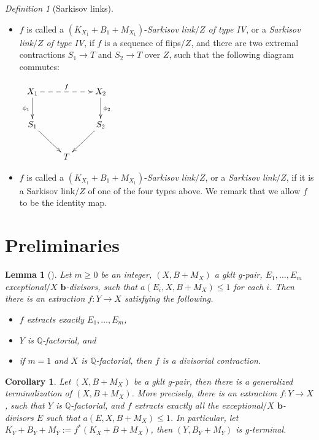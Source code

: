 \documentclass[11pt]{amsart}
\numberwithin{equation}{section}
\newcommand{\bb}{\bm{b}}
\newcommand{\Qq}{\mathbb{Q}}
\newtheorem{cor}[thm]{Corollary}
\newtheorem{lem}[thm]{Lemma}
\theoremstyle{definition}
\theoremstyle{remark}
\newtheorem{defn}[thm]{Definition}
\theoremstyle{definition}
\begin{document}
\begin{defn}[Sarkisov links]
\begin{itemize}
\item $f$ is called a $(K_{X_1}+B_1+M_{X_1})$-\emph{Sarkisov link$/Z$ of type IV}, or a \emph{Sarkisov link$/Z$ of type IV}, if $f$ is a sequence of flips$/Z$, and there are two extremal contractions $S_1\rightarrow T$ and $S_2\rightarrow T$ over $Z$, such that the following diagram commutes:
\begin{center}$\xymatrix{
 X_1\ar@{-->}[rr]^{f}\ar@{->}[d]_{\phi_1}& &X_2\ar@{->}[d]^{\phi_2} \\
      S_1\ar@{->}[dr]   &  & S_2\ar@{->}[dl] \\
    & T&}$
\end{center}
\item $f$ is called a  $(K_{X_1}+B_1+M_{X_1})$-\emph{Sarkisov link}$/Z$, or a \emph{Sarkisov link}$/Z$, if it is a Sarkisov link$/Z$ of one of the four types above. We remark that we allow $f$ to be the identity map.
\end{itemize}
\end{defn}









\section{Preliminaries} 

\begin{lem}[{\cite[Lemma 4.5 and 4.6]{BZ16}}]\label{lem: gen extraction}
Let $m\geq 0$ be an integer, $(X,B+M_X)$ a gklt g-pair, $E_1,\dots,E_m$ exceptional$/X$ $\bb$-divisors, such that $a(E_i,X,B+M_X)\leq 1$ for each $i$. Then there is an extraction $f: Y\rightarrow X$ satisfying the following.
\begin{itemize}
\item $f$ extracts exactly $E_1,\dots,E_m$,
\item $Y$ is $\Qq$-factorial, and
\item if $m=1$ and $X$ is $\Qq$-factorial, then $f$ is a divisorial contraction.
\end{itemize}
\end{lem}

\begin{cor}\label{cor: gen terminalization}
Let $(X,B+M_X)$ be a gklt g-pair, then there is a generalized terminalization of $(X,B+M_X)$. More precisely, there is an extraction $f: Y\rightarrow X$, such that $Y$ is $\Qq$-factorial, and $f$ extracts exactly all the exceptional$/X$ $\bb$-divisors $E$ such that $a(E,X,B+M_X)\leq 1$. In particular, let $K_Y+B_Y+M_Y:=f^*(K_X+B+M_X)$, then $(Y,B_Y+M_Y)$ is g-terminal.
\end{cor}
\end{document}
